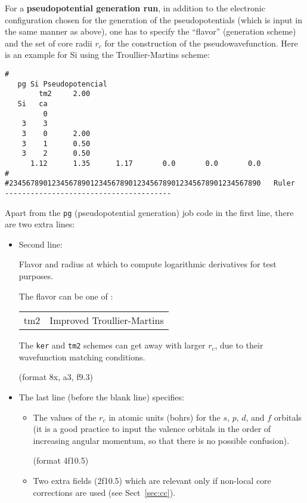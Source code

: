 \documentclass[11pt]{article}
\begin{document}
For a {\bf pseudopotential generation run}, in addition to the
electronic configuration chosen for the generation of the
pseudopotentials (which is input in the same manner as above), one has
to specify the ``flavor'' (generation scheme) and the set of core
radii $r_c$ for the construction of the pseudowavefunction. Here is an
example for Si using the Troullier-Martins scheme:

\begin{verbatim}
# 
   pg Si Pseudopotencial
        tm2     2.00
   Si   ca
         0
    3    3
    3    0      2.00
    3    1      0.50
    3    2      0.50
      1.12      1.35      1.17       0.0       0.0       0.0
#
#23456789012345678901234567890123456789012345678901234567890   Ruler
---------------------------------------
\end{verbatim}

Apart from the {\tt pg} (pseudopotential generation) job code in the
first line, there are two extra lines:

\begin{itemize}
\item Second line: 

Flavor and radius at which to compute logarithmic
derivatives for test purposes. 

The flavor can be one of :
\begin{tabular}{ll}
	tm2	&Improved Troullier-Martins\\
\end{tabular}

The {\tt ker} and {\tt tm2} schemes can get away with larger $r_c$,
due to their wavefunction matching conditions.

(format 8x, a3, f9.3)

\item The last line (before the blank line) specifies:

\begin{itemize}
\item The values of the $r_c$ in atomic units (bohrs) for the $s$,
$p$, $d$, and $f$ orbitals (it is a good practice to input the valence
orbitals in the order of increasing angular momentum, so that there is
no possible confusion).

(format 4f10.5)  

\item Two extra fields (2f10.5) which are relevant only if non-local
core corrections are used (see Sect~\ref{sec:cc}).
\end{itemize}
\end{itemize}
\end{document}
